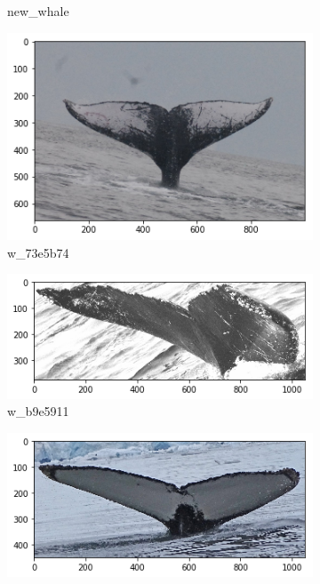 \begin{frame}[c]
\begin{figure}
\begin{subfigure}[b]{0.24\linewidth}
            \caption{new\_whale}
        \end{subfigure}
        \begin{subfigure}[b]{0.24\linewidth}
            \centering
            \includegraphics[width=\linewidth]{Whales/w_73e5b74.png}
            \caption{w\_73e5b74}
        \end{subfigure}
        \begin{subfigure}[b]{0.24\linewidth}
            \centering
            \includegraphics[width=\linewidth]{Whales/w_b9e5911.png}
            \caption{w\_b9e5911}
        \end{subfigure}
        \begin{subfigure}[b]{0.24\linewidth}
            \centering
            \includegraphics[width=\linewidth]{Whales/new_whale2.png}

\end{subfigure}
\end{figure}
\end{frame}

